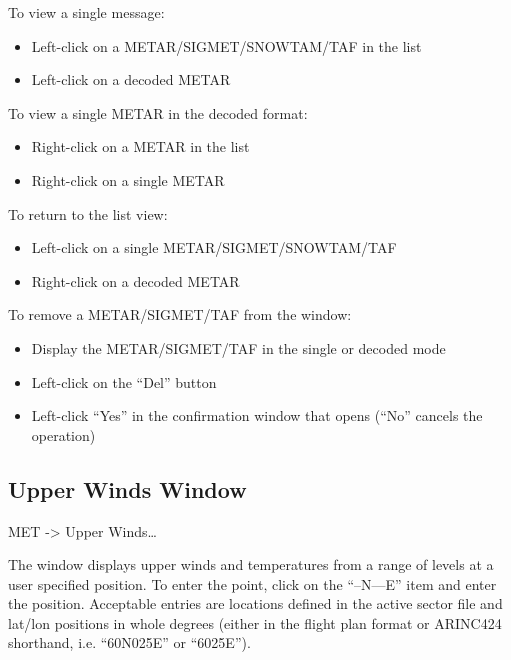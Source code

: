 \documentclass[a4paper,oneside,11pt]{memoir}
\begin{document}
\bigskip

To view a single message:

\begin{itemize}
    \item Left-click on a METAR/SIGMET/SNOWTAM/TAF in the list
    \item Left-click on a decoded METAR
\end{itemize}

\bigskip

To view a single METAR in the decoded format:

\begin{itemize}
    \item Right-click on a METAR in the list
    \item Right-click on a single METAR
\end{itemize}

\bigskip

To return to the list view:

\begin{itemize}
    \item Left-click on a single METAR/SIGMET/SNOWTAM/TAF
    \item Right-click on a decoded METAR
\end{itemize}

\bigskip

To remove a METAR/SIGMET/TAF from the window:

\begin{itemize}
    \item Display the METAR/SIGMET/TAF in the single or decoded mode
    \item Left-click on the “Del” button
    \item Left-click “Yes” in the confirmation window that opens (“No” cancels the operation)
\end{itemize}

\subsection{Upper Winds Window}\label{win:uww}

 MET -> Upper Winds…


The window displays upper winds and temperatures from a range of levels at a user specified position. To enter the point, click on the “--N---E” item and enter the position. Acceptable entries are locations defined in the active sector file and lat/lon positions in whole degrees (either in the flight plan format or ARINC424 shorthand, i.e. “60N025E” or “6025E”).
\end{document}
